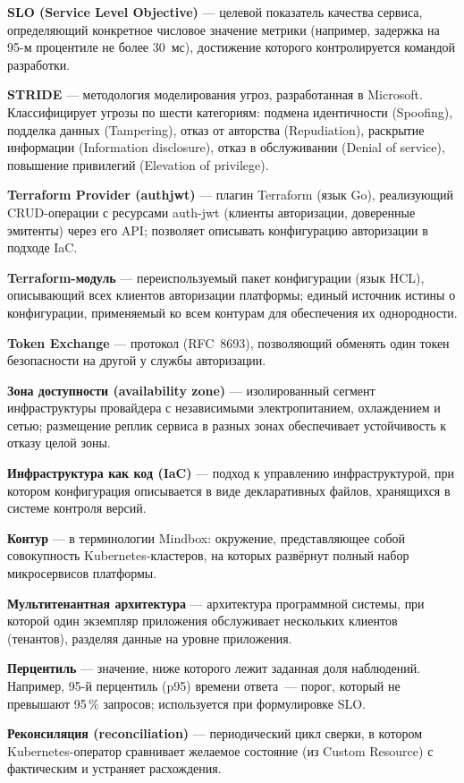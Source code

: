 \textbf{SLO (Service Level Objective)} --- целевой показатель качества сервиса,
определяющий конкретное числовое значение метрики
(например, задержка на 95-м процентиле не более 30~мс),
достижение которого контролируется командой разработки.

\textbf{STRIDE} --- методология моделирования угроз, разработанная в Microsoft.
Классифицирует угрозы по шести категориям: подмена идентичности (Spoofing),
подделка данных (Tampering), отказ от авторства (Repudiation),
раскрытие информации (Information disclosure), отказ в обслуживании (Denial of service),
повышение привилегий (Elevation of privilege).

\textbf{Terraform Provider (authjwt)} --- плагин Terraform (язык Go),
реализующий CRUD-операции с ресурсами auth-jwt
(клиенты авторизации, доверенные эмитенты) через его API;
позволяет описывать конфигурацию авторизации в подходе IaC.

\textbf{Terraform-модуль} --- переиспользуемый пакет конфигурации (язык HCL),
описывающий всех клиентов авторизации платформы;
единый источник истины о конфигурации, применяемый ко всем контурам
для обеспечения их однородности.

\textbf{Token Exchange} --- протокол (RFC~8693), позволяющий обменять
один токен безопасности на другой у службы авторизации.

\textbf{Зона доступности (availability zone)} --- изолированный сегмент
инфраструктуры провайдера с независимыми электропитанием, охлаждением и сетью;
размещение реплик сервиса в разных зонах обеспечивает устойчивость к отказу целой зоны.

\textbf{Инфраструктура как код (IaC)} --- подход к управлению инфраструктурой,
при котором конфигурация описывается в виде декларативных файлов,
хранящихся в системе контроля версий.

\textbf{Контур} --- в терминологии Mindbox: окружение, представляющее собой
совокупность Kubernetes-кластеров, на которых развёрнут полный набор
микросервисов платформы.

\textbf{Мультитенантная архитектура} --- архитектура программной системы,
при которой один экземпляр приложения обслуживает нескольких клиентов (тенантов),
разделяя данные на уровне приложения.

\textbf{Перцентиль} --- значение, ниже которого лежит заданная доля наблюдений.
Например, 95-й перцентиль (p95) времени ответа~--- порог, который не превышают
95\,\% запросов; используется при формулировке SLO.

\textbf{Реконсиляция (reconciliation)} --- периодический цикл сверки,
в котором Kubernetes-оператор сравнивает желаемое состояние (из Custom Resource)
с фактическим и устраняет расхождения.

